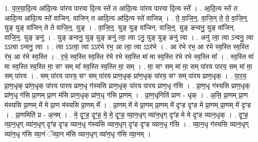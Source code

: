 \documentclass[17pt]{extarticle}
\begin{document}
1. पा॒र॒या॒दि॒त्य आ॑दि॒त्यः पा॑रय पारया दि॒त्य स्ते॑ त आदि॒त्यः पा॑रय पारया दि॒त्य स्ते᳚ । . आ॒दि॒त्य स्ते॑ त आदि॒त्य आ॑दि॒त्य स्ते॑ वाजिन्. वाजिन् त आदि॒त्य आ॑दि॒त्य स्ते॑ वाजिन्न् । . ते॒ वा॒जि॒न्॒. वा॒जि॒न् ते॒ ते॒ वा॒जि॒न्॒. युङ् युङ् वा॑जिन् ते ते वाजि॒न्॒. युङ् । . वा॒जि॒न्॒. युङ् युङ् वा॑जिन्. वाजि॒न्॒. युङ् ङन्वनु॒ युङ् वा॑जिन्. वाजि॒न्॒. युङ् ङनु॑ । . युङ् ङन्वनु॒ युङ् युङ् ङनु॑ त्वा॒ त्वा ऽनु॒ युङ् युङ् ङनु॑ त्वा । . अनु॑ त्वा॒ त्वा ऽन्वनु॒ त्वा ऽऽत्वा ऽन्वनु॒ त्वा । . त्वा ऽऽत्वा॒ त्वा ऽऽर॑भे रभ॒ आ त्वा॒ त्वा ऽऽर॑भे । . आ र॑भे रभ॒ आ र॑भे स्व॒स्ति स्व॒स्ति र॑भ॒ आ र॑भे स्व॒स्ति । . र॒भे॒ स्व॒स्ति स्व॒स्ति र॑भे रभे स्व॒स्ति मा॑ मा स्व॒स्ति र॑भे रभे स्व॒स्ति मा᳚ । . स्व॒स्ति मा॑ मा स्व॒स्ति स्व॒स्ति मा॒ सꣳ सम् मा᳚ स्व॒स्ति स्व॒स्ति मा॒ सम् । . मा॒ सꣳ सम् मा॑ मा॒ सम् पा॑रय पारय॒ सम् मा॑ मा॒ सम् पा॑रय । . सम् पा॑रय पारय॒ सꣳ सम् पा॑रय प्राण॒धृक् प्रा॑ण॒धृक् पा॑रय॒ सꣳ सम् पा॑रय प्राण॒धृक् । . पा॒र॒य॒ प्रा॒ण॒धृक् प्रा॑ण॒धृक् पा॑रय पारय प्राण॒धृ ग॑स्यसि प्राण॒धृक् पा॑रय पारय प्राण॒धृ ग॑सि । . प्रा॒ण॒धृ ग॑स्यसि प्राण॒धृक् प्रा॑ण॒धृ ग॑सि प्रा॒णम् प्रा॒ण म॑सि प्राण॒धृक् प्रा॑ण॒धृ ग॑सि प्रा॒णम् । . प्रा॒ण॒धृगिति॑ प्राण - धृक् । . अ॒सि॒ प्रा॒णम् प्रा॒ण म॑स्यसि प्रा॒णम् मे॑ मे प्रा॒ण म॑स्यसि प्रा॒णम् मे᳚ । . प्रा॒णम् मे॑ मे प्रा॒णम् प्रा॒णम् मे॑ दृꣳह दृꣳह मे प्रा॒णम् प्रा॒णम् मे॑ दृꣳह । . प्रा॒णमिति॑ प्र - अ॒नम् । . मे॒ दृꣳ॒॒ह॒ दृꣳ॒॒ह॒ मे॒ मे॒ दृꣳ॒॒ह॒ व्या॒न॒धृग् व्या॑न॒धृग् दृꣳ॑ह मे मे दृꣳह व्यान॒धृक् । . दृꣳ॒॒ह॒ व्या॒न॒धृग् व्या॑न॒धृग् दृꣳ॑ह दृꣳह व्यान॒धृ ग॑स्यसि व्यान॒धृग् दृꣳ॑ह दृꣳह व्यान॒धृ ग॑सि । . व्या॒न॒धृ ग॑स्यसि व्यान॒धृग् व्या॑न॒धृ ग॑सि व्या॒नं ॅव्या॒न म॑सि व्यान॒धृग् व्या॑न॒धृ ग॑सि व्या॒नम् । \newline
\end{document}
